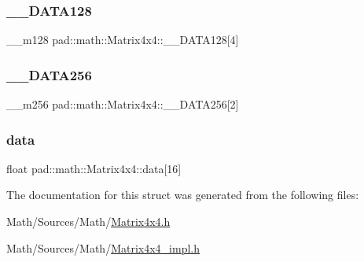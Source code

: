 \subsubsection{\texorpdfstring{\+\_\+\+\_\+\+D\+A\+T\+A128}{\_\_DATA128}}
{\footnotesize\ttfamily \+\_\+\+\_\+m128 pad\+::math\+::\+Matrix4x4\+::\+\_\+\+\_\+\+D\+A\+T\+A128\mbox{[}4\mbox{]}}

\mbox{\label{structpad_1_1math_1_1_matrix4x4_a1943e1b4a06834d2ff79192b9688463c}} 
\subsubsection{\texorpdfstring{\+\_\+\+\_\+\+D\+A\+T\+A256}{\_\_DATA256}}
{\footnotesize\ttfamily \+\_\+\+\_\+m256 pad\+::math\+::\+Matrix4x4\+::\+\_\+\+\_\+\+D\+A\+T\+A256\mbox{[}2\mbox{]}}

\mbox{\label{structpad_1_1math_1_1_matrix4x4_a3ce7e8b8246a13268d4bc9c5d2f202f7}} 
\subsubsection{\texorpdfstring{data}{data}}
{\footnotesize\ttfamily float pad\+::math\+::\+Matrix4x4\+::data\mbox{[}16\mbox{]}}



The documentation for this struct was generated from the following files\+:\begin{DoxyCompactItemize}
\item 
Math/\+Sources/\+Math/\mbox{\hyperlink{_matrix4x4_8h}{Matrix4x4.\+h}}\item 
Math/\+Sources/\+Math/\mbox{\hyperlink{_matrix4x4__impl_8h}{Matrix4x4\+\_\+impl.\+h}}\end{DoxyCompactItemize}

